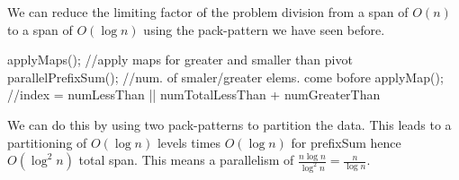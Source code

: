 We can reduce the limiting factor of the problem division from a span of $O(n)$ to a span of $O(\log n)$
using the pack-pattern we have seen before.

\begin{algorithm}
applyMaps(); //apply maps for greater and smaller than pivot
parallelPrefixSum(); //num. of smaler/greater elems. come bofore
applyMap(); //index = numLessThan || numTotalLessThan + numGreaterThan
\end{algorithm}

We can do this by using two pack-patterns to partition the data. This leads to a partitioning of $O(\log n)$
levels times $O(\log n)$ for prefixSum hence $O(\log^2 n)$ total span. This means a parallelism of 
$\frac{n \log n}{\log^2 n} = \frac{n}{\log n}$.

        